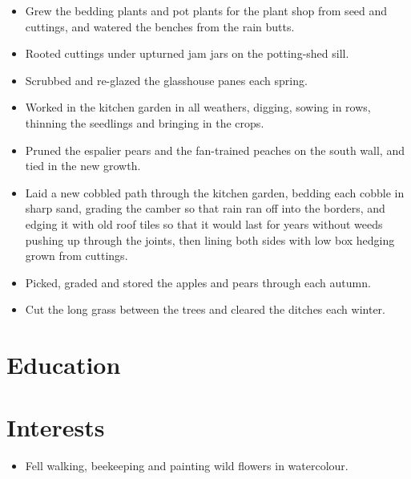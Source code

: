\documentclass[11pt,a4paper,sans]{moderncv}
\begin{document}
\vspace{3pt}

{\small
\begin{itemize}
    \item Grew the bedding plants and pot plants for the plant shop from seed and cuttings, and watered the benches from the rain butts.
    \item Rooted cuttings under upturned jam jars on the potting-shed sill.
    \item Scrubbed and re-glazed the glasshouse panes each spring.
\end{itemize}\par}
\addvspace{.5em}

\vspace{3pt}

{\small
\begin{itemize}
    \item Worked in the kitchen garden in all weathers, digging, sowing in rows, thinning the seedlings and bringing in the crops.
    \item Pruned the espalier pears and the fan-trained peaches on the south wall, and tied in the new growth.
    \item Laid a new cobbled path through the kitchen garden, bedding each cobble in sharp sand, grading the camber so that rain ran off into the borders, and edging it with old roof tiles so that it would last for years without weeds pushing up through the joints, then lining both sides with low box hedging grown from cuttings.
\end{itemize}\par}
\addvspace{.5em}

\vspace{3pt}

{\small
\begin{itemize}
    \item Picked, graded and stored the apples and pears through each autumn.
    \item Cut the long grass between the trees and cleared the ditches each winter.
\end{itemize}\par}
\addvspace{.5em}

\section{Education}
\vspace{1pt}


\section{Interests}
\vspace{1pt}
{\small
\begin{itemize}
    \item Fell walking, beekeeping and painting wild flowers in watercolour.
\end{itemize}\par}
\addvspace{.5em}
\end{document}
